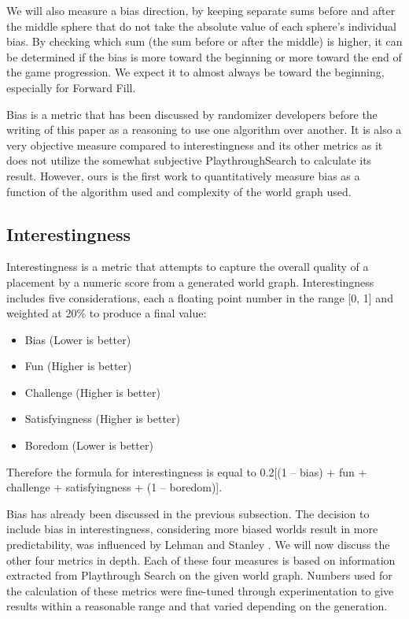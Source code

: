 \documentclass{ieeeaccess}
\begin{document}
We will also measure a bias direction, by keeping separate sums before and after the middle
sphere that do not take the absolute value of each sphere's individual bias. By checking which
sum (the sum before or after the middle) is higher, it can be determined if the bias is more
toward the beginning or more toward the end of the game progression. We expect it to almost
always be toward the beginning, especially for Forward Fill.

Bias is a metric that has been discussed by randomizer developers before the writing of this
paper as a reasoning to use one algorithm over another. It is also a very objective measure
compared to interestingness and its other metrics as it does not utilize the somewhat
subjective PlaythroughSearch to calculate its result. However, ours is the first work to
quantitatively measure bias as a function of the algorithm used and complexity of the world
graph used.

\subsection{Interestingness}
Interestingness is a metric that attempts to capture the overall quality of a placement by a
numeric score from a generated world graph. Interestingness includes five considerations, each
a floating point number in the range [0, 1] and weighted at 20\% to produce a final value:

\begin{itemize}
    \item Bias (Lower is better)
    \item Fun (Higher is better)
    \item Challenge (Higher is better)
    \item Satisfyingness (Higher is better)
    \item Boredom (Lower is better)
\end{itemize}

Therefore the formula for interestingness is equal to
0.2[(1 – bias) + fun + challenge + satisfyingness + (1 – boredom)].

Bias has already been discussed in the previous subsection. The decision to include bias in
interestingness, considering more biased worlds result in more predictability, was influenced
by Lehman and Stanley \cite{b7}. We will now discuss the other four metrics in depth.  Each of
these four measures is based on information extracted from Playthrough Search on the given
world graph. Numbers used for the calculation of these metrics were fine-tuned through
experimentation to give results within a reasonable range and that varied depending on 
the generation.
\end{document}
